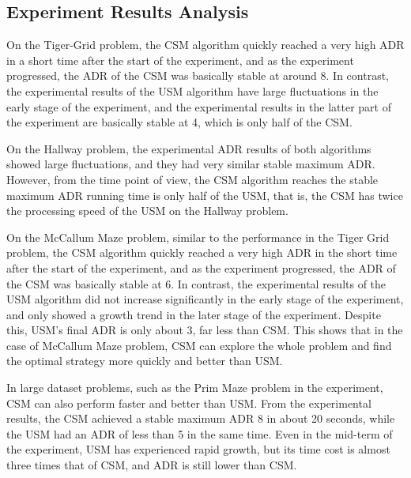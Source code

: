 \documentclass{article}
\begin{document}
\subsection{Experiment Results Analysis}

On the Tiger-Grid problem, the CSM algorithm quickly reached a very high ADR in a short
time after the start of the experiment, and as the experiment progressed, the ADR of the
CSM was basically stable at around 8. In contrast, the experimental results of the USM
algorithm have large fluctuations in the early stage of the experiment, and the
experimental results in the latter part of the experiment are basically stable at 4, which
is only half of the CSM.

On the Hallway problem, the experimental ADR results of both algorithms showed large fluctuations, 
and they had very similar stable maximum ADR. However, from the time point of view, the CSM 
algorithm reaches the stable maximum ADR running time is only half of the USM, that is, the CSM 
has twice the processing speed of the USM on the Hallway problem.


On the McCallum Maze problem, similar to the performance in the Tiger Grid
problem, the CSM algorithm quickly reached a very high ADR in the short time after
the start of the experiment, and as the experiment progressed, the ADR of the CSM
was basically stable at 6. In contrast, the experimental results of the USM algorithm
did not increase significantly in the early stage of the experiment, and only showed
a growth trend in the later stage of the experiment. Despite this, USM's final ADR
is only about 3, far less than CSM. This shows that in the case of McCallum Maze problem, CSM can explore the whole problem and find the optimal strategy more quickly and better than USM.

In large dataset problems, such as the Prim Maze problem in the experiment, CSM can also perform 
faster and better than USM. From the experimental results, the CSM achieved a stable maximum ADR 8 
in about 20 seconds, while the USM had an ADR of less than 5 in the same time. Even in the mid-term 
of the experiment, USM has experienced rapid growth, but its time cost is almost three times that of 
CSM, and ADR is still lower than CSM.
\end{document}
